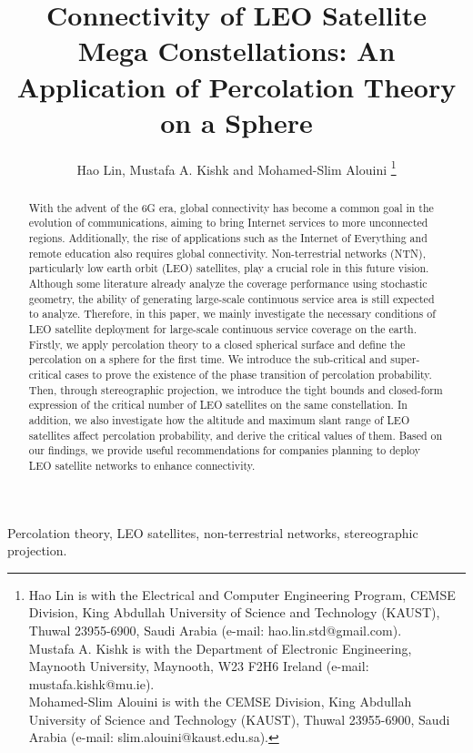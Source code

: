 \documentclass[final]{IEEEtran}
\begin{document}

\graphicspath{{./Figures/}}
\title{
Connectivity of LEO Satellite Mega Constellations: An Application of Percolation Theory on a Sphere}
\author{
 Hao Lin,  Mustafa A. Kishk and Mohamed-Slim Alouini
\thanks{Hao Lin is with the Electrical and Computer Engineering Program, CEMSE Division, King Abdullah University of Science and Technology (KAUST),
Thuwal 23955-6900, Saudi Arabia (e-mail: hao.lin.std@gmail.com).\\
\indent Mustafa A. Kishk is with the Department of Electronic Engineering,
Maynooth University, Maynooth, W23 F2H6 Ireland (e-mail:
mustafa.kishk@mu.ie).\\
\indent Mohamed-Slim Alouini is with the CEMSE Division, King Abdullah
University of Science and Technology (KAUST), Thuwal 23955-6900,
Saudi Arabia (e-mail: slim.alouini@kaust.edu.sa).}
}

\maketitle
\vspace{-2cm}
\begin{abstract}
With the advent of the 6G era, global connectivity has become a common goal in the evolution of communications, aiming to bring Internet services to more unconnected regions. Additionally, the rise of applications such as the Internet of Everything and remote education also requires global connectivity. Non-terrestrial networks (NTN), particularly low earth orbit (LEO) satellites, play a crucial role in this future vision. Although some literature already analyze the coverage performance using stochastic geometry, the ability of generating large-scale continuous service area is still expected to analyze.  Therefore, in this paper, we mainly investigate the necessary conditions of LEO satellite deployment for large-scale continuous service coverage on the earth. Firstly, we apply percolation theory to a closed spherical surface and define the percolation on a sphere for the first time. We introduce the sub-critical and super-critical cases to prove the existence of the phase transition of percolation probability. Then, through stereographic projection, we introduce the tight bounds and closed-form expression of the critical number of LEO satellites on the same constellation. In addition, we also investigate how the altitude and maximum slant range of LEO satellites affect percolation probability, and derive the critical values of them. Based on our findings, we provide useful recommendations for companies planning to deploy LEO satellite networks to enhance connectivity.
\end{abstract}
\begin{IEEEkeywords}
Percolation theory, LEO satellites, non-terrestrial networks, stereographic projection.
\end{IEEEkeywords}
\end{document}
